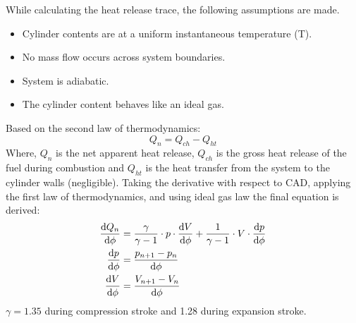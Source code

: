 \documentclass[11pt]{article}
\begin{document}
While calculating the heat release trace, the following assumptions are made.
\begin{itemize}
    \item Cylinder contents are at a uniform instantaneous temperature (T).
    \item No mass flow occurs across system boundaries.
    \item System is adiabatic.
    \item The cylinder content behaves like an ideal gas.
\end{itemize}
Based on the second law of thermodynamics:
\begin{equation}
    Q_n = Q_{ch} - Q_{ht}
\end{equation}
Where, $Q_n$ is the net apparent heat release, $Q_{ch}$ is the gross heat release of the fuel during combustion and $Q_{ht}$ is the heat transfer from the system to the cylinder walls (negligible). Taking the derivative with respect to CAD, applying the first law of thermodynamics, and using ideal gas law the final equation is derived:
\begin{align}
    \frac{\dif Q_{n}}{\dif \phi} &= \frac{\gamma}{\gamma - 1}\cdot p\cdot \frac{\dif V}{\dif \phi} + \frac{1}{\gamma - 1} \cdot V \cdot \frac{\dif p}{\dif \phi}\\
    \frac{\dif p}{\dif \phi} &= \frac{p_{n+1}-p_n}{\dif \phi}\\
    \frac{\dif V}{\dif \phi} &= \frac{V_{n+1}-V_n}{\dif \phi}
\end{align}
$\gamma = 1.35$ during compression stroke and 1.28 during expansion stroke.
\end{document}
